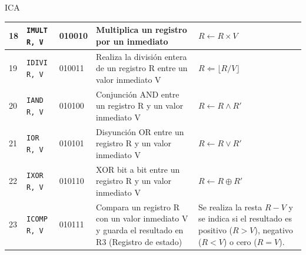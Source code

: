 ICA\documentclass{article}
\begin{document}
\begin{longtable}{|p{}|p{}|p{}|p{}|p{}|}
  \hline
  18              & \texttt{IMULT R, V}  & 010010                          & Multiplica un registro por un inmediato                                                                                                                                                       & $R \leftarrow R \times V$                                                                                           \\
  \hline
  19              & \texttt{IDIVI R, V}  & 010011                          & Realiza la división entera de un registro R entre un valor inmediato V                                                                                                                        & $R \Leftarrow \lfloor R / V \rfloor $                                                                               \\
  \hline
  20              & \texttt{IAND R, V}   & 010100                          & Conjunción AND entre un registro R y un valor inmediato V                                                                                                                                     & $ R \leftarrow R \wedge R'$                                                                                         \\
  \hline
  21              & \texttt{IOR R, V}    & 010101                          & Disyunción OR entre un registro R y un valor inmediato V                                                                                                                                      & $R \leftarrow R \vee R'$                                                                                            \\
  \hline
  22              & \texttt{IXOR R, V}   & 010110                          & XOR bit a bit entre un registro R y un valor inmediato V                                                                                                                                      & $R \leftarrow R \oplus R'$                                                                                          \\
  \hline
  23              & \texttt{ICOMP R, V}  & 010111                          & Compara un registro R con un valor inmediato V y guarda el resultado en R3 (Registro de estado)                                                                                               & Se realiza la resta $R - V$ y se indica si el resultado es positivo ($R > V$), negativo ($R < V$) o cero ($R = V$). \\

\end{longtable}
\end{document}
